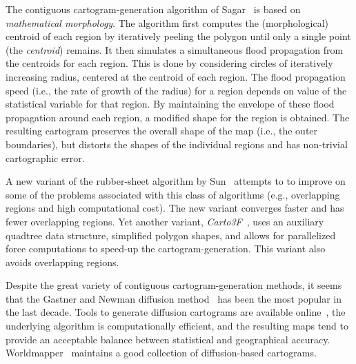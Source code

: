 \documentclass{egpubl}
\begin{document}
The contiguous cartogram-generation algorithm of Sagar~\cite{sagar2013cartograms} is based on {\em mathematical morphology}. The algorithm first computes the (morphological) centroid of each region by iteratively peeling the polygon until only a single point (the \textit{centroid}) remains. It then simulates a simultaneous flood propagation from the centroids for each region. This is done by considering circles of iteratively increasing radius, centered at the centroid of each region. The flood propagation speed (i.e., the rate of growth of the radius) for a region depends on value of the statistical variable for that region. By maintaining the envelope of these flood propagation around each region, a modified shape for the region is obtained.
The resulting cartogram preserves the overall shape of the map (i.e., the outer boundaries), but distorts the shapes of the individual regions and has non-trivial cartographic error.




A new variant of the rubber-sheet algorithm by Sun~\cite{sun2013optimized} attempts to to improve on some of the problems associated with this class of algorithms (e.g., overlapping regions and high computational cost). The new variant converges faster and has fewer overlapping regions. Yet another variant, \textit{Carto3F}~\cite{sun2013fast}, uses an auxiliary quadtree data structure, simplified polygon shapes, and allows for parallelized force computations to speed-up the cartogram-generation. This variant also avoids overlapping regions.




Despite the great variety of contiguous cartogram-generation methods, it seems that the Gastner and Newman diffusion method~\cite{GN04} has been the most popular in the last decade.  
Tools to generate diffusion cartograms are available online~\cite{scapetoad}, the underlying algorithm is computationally efficient, and the resulting maps tend to provide an acceptable balance between statistical and geographical accuracy. 
Worldmapper~\cite{WorldMapper} maintains a good collection 
of diffusion-based cartograms.
\end{document}
